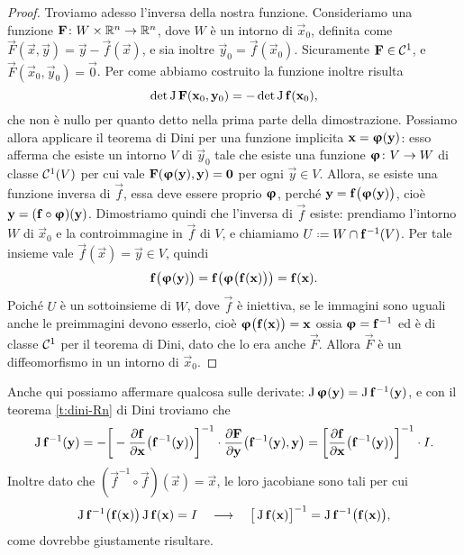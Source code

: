 \begin{proof}
	Troviamo adesso l'inversa della nostra funzione.
	Consideriamo una funzione $\mathbf{F}\colon W\times\mathbb{R}^n\to\mathbb{R}^n$, dove $W$ è un intorno di $\vec x_0$, definita come $\vec F(\vec x,\vec y)=\vec y-\vec f(\vec x)$, e sia inoltre $\vec y_0=\vec f(\vec x_0)$.
	Sicuramente $\mathbf{F}\in\mathcal{C}^{{1}}$, e $\vec F(\vec x_0,\vec y_0)=\vec 0$.
	Per come abbiamo costruito la funzione inoltre risulta
	\begin{equation}
		\det\operatorname{J}\mathbf{F}(\mathbf{x}_0,\mathbf{y}_0)=-\det\operatorname{J}\mathbf{f}(\mathbf{x}_0),
	\end{equation}
	che non è nullo per quanto detto nella prima parte della dimostrazione.
	Possiamo allora applicare il teorema di Dini per una funzione implicita $\mathbf{x}=\bm{\upvarphi}(\mathbf{y})$: esso afferma che esiste un intorno $V$ di $\vec y_0$ tale che esiste una funzione $\bm{\upvarphi}\colon V\to W$ di classe $\mathcal{C}^{{1}}(V)$ per cui vale $\mathbf{F}(\bm{\upvarphi}(\mathbf{y}),\mathbf{y})=\mathbf{0}$ per ogni $\vec y\in V$.
	Allora, se esiste una funzione inversa di $\vec f$, essa deve essere proprio $\bm{\upvarphi}$, perch\'e $\mathbf{y}=\mathbf{f}\big(\bm{\upvarphi}(\mathbf{y})\big)$, cioè $\mathbf{y}=(\mathbf{f}\circ \bm{\upvarphi})(\mathbf{y})$.
	Dimostriamo quindi che l'inversa di $\vec f$ esiste: prendiamo l'intorno $W$ di $\vec x_0$ e la controimmagine in $\vec f$ di $V$, e chiamiamo $U\defeq W\cap\vec f^{-1}(V)$.
	Per tale insieme vale $\vec f(\vec x)=\vec y\in V$, quindi
	\begin{equation*}
		\mathbf{f}\big(\bm{\upvarphi}(\mathbf{y})\big)=\mathbf{f}\big(\bm{\upvarphi}\big(\mathbf{f}(\mathbf{x})\big)\big)=\mathbf{f}(\mathbf{x}).
	\end{equation*}
	Poiché $U$ è un sottoinsieme di $W$, dove $\vec f$ è iniettiva, se le immagini sono uguali anche le preimmagini devono esserlo, cioè $\bm{\upvarphi}\big(\mathbf{f}(\mathbf{x})\big)=\mathbf{x}$ ossia $\bm{\upvarphi}=\mathbf{f}^{-1}$ ed è di classe $\mathcal{C}^{{1}}$ per il teorema di Dini, dato che lo era anche $\vec F$.
	Allora $\vec F$ è un diffeomorfismo in un intorno di $\vec x_0$.
\end{proof}
Anche qui possiamo affermare qualcosa sulle derivate: $\operatorname{J}\bm{\upvarphi}(\mathbf{y})=\operatorname{J}\mathbf{f}^{-1}(\mathbf{y})$, e con il teorema \ref{t:dini-Rn} di Dini troviamo che
\begin{equation}
	\operatorname{J}\mathbf{f}^{-1}(\mathbf{y})=-\bigg[-\frac{\partial {\mathbf{f}}}{\partial {\mathbf{x}}}\big(\mathbf{f}^{-1}(\mathbf{y})\big)\bigg]^{-1}\cdot\frac{\partial {\mathbf{F}}}{\partial {\mathbf{y}}}\big(\mathbf{f}^{-1}(\mathbf{y}),\mathbf{y}\big)
	=\bigg[\frac{\partial {\mathbf{f}}}{\partial {\mathbf{x}}}\big(\mathbf{f}^{-1}(\mathbf{y})\big)\bigg]^{-1}\cdot I.
\end{equation}
Inoltre dato che $(\vec f^{-1}\circ\vec f)(\vec x)=\vec x$, le loro jacobiane sono tali per cui
\begin{equation*}
	\operatorname{J}\mathbf{f}^{-1}\big(\mathbf{f}(\mathbf{x})\big)\operatorname{J}\mathbf{f}(\mathbf{x})=I\quad\longrightarrow\quad \big[\operatorname{J}\mathbf{f}(\mathbf{x})\big]^{-1}=\operatorname{J}\mathbf{f}^{-1}\big(\mathbf{f}(\mathbf{x})\big),
\end{equation*}
come dovrebbe giustamente risultare.

